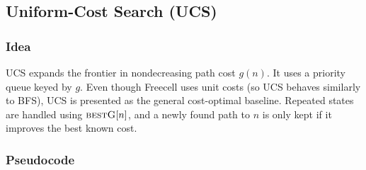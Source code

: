 \subsection{Uniform-Cost Search (UCS)}
  \subsubsection{Idea}
  UCS expands the frontier in nondecreasing path cost $g(n)$. It uses a priority queue keyed by $g$. Even though Freecell uses unit costs (so UCS
  behaves similarly to BFS), UCS is presented as the general cost-optimal baseline. Repeated states are handled using $\textsc{bestG}[n]$, and a newly
  found path to $n$ is only kept if it improves the best known cost.

  \subsubsection{Pseudocode }
